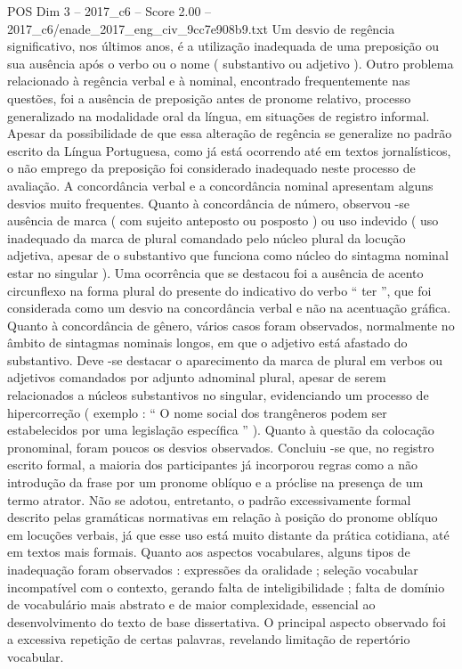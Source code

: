 \begin{textsample}{POS Dim 3 – 2017\_c6 – Score 2.00 – 2017\_c6/enade\_2017\_eng\_civ\_9cc7e908b9.txt}
Um desvio de regência significativo, nos últimos anos, é a utilização inadequada de uma preposição ou sua ausência após o verbo ou o nome ( substantivo ou adjetivo ).
Outro problema relacionado à regência verbal e à nominal, encontrado frequentemente nas questões, foi a ausência de preposição antes de pronome relativo, processo generalizado na modalidade oral da língua, em situações de registro informal.
Apesar da possibilidade de que essa alteração de regência se generalize no padrão escrito da Língua Portuguesa, como já está ocorrendo até em textos jornalísticos, o não emprego da preposição foi considerado inadequado neste processo de avaliação.
A concordância verbal e a concordância nominal apresentam alguns desvios muito frequentes.
Quanto à concordância de número, observou -se ausência de marca ( com sujeito anteposto ou posposto ) ou uso indevido ( uso inadequado da marca de plural comandado pelo núcleo plural da locução adjetiva, apesar de o substantivo que funciona como núcleo do sintagma nominal estar no singular ).
Uma ocorrência que se destacou foi a ausência de acento circunflexo na forma plural do presente do indicativo do verbo “ ter ”, que foi considerada como um desvio na concordância verbal e não na acentuação gráfica.
Quanto à concordância de gênero, vários casos foram observados, normalmente no âmbito de sintagmas nominais longos, em que o adjetivo está afastado do substantivo.
Deve -se destacar o aparecimento da marca de plural em verbos ou adjetivos comandados por adjunto adnominal plural, apesar de serem relacionados a núcleos substantivos no singular, evidenciando um processo de hipercorreção ( exemplo : “ O nome social dos trangêneros podem ser estabelecidos por uma legislação específica ” ).
Quanto à questão da colocação pronominal, foram poucos os desvios observados.
Concluiu -se que, no registro escrito formal, a maioria dos participantes já incorporou regras como a não introdução da frase por um pronome oblíquo e a próclise na presença de um termo atrator.
Não se adotou, entretanto, o padrão excessivamente formal descrito pelas gramáticas normativas em relação à posição do pronome oblíquo em locuções verbais, já que esse uso está muito distante da prática cotidiana, até em textos mais formais.
Quanto aos aspectos vocabulares, alguns tipos de inadequação foram observados : expressões da oralidade ; seleção vocabular incompatível com o contexto, gerando falta de inteligibilidade ; falta de domínio de vocabulário mais abstrato e de maior complexidade, essencial ao desenvolvimento do texto de base dissertativa.
O principal aspecto observado foi a excessiva repetição de certas palavras, revelando limitação de repertório vocabular.

\end{textsample}
